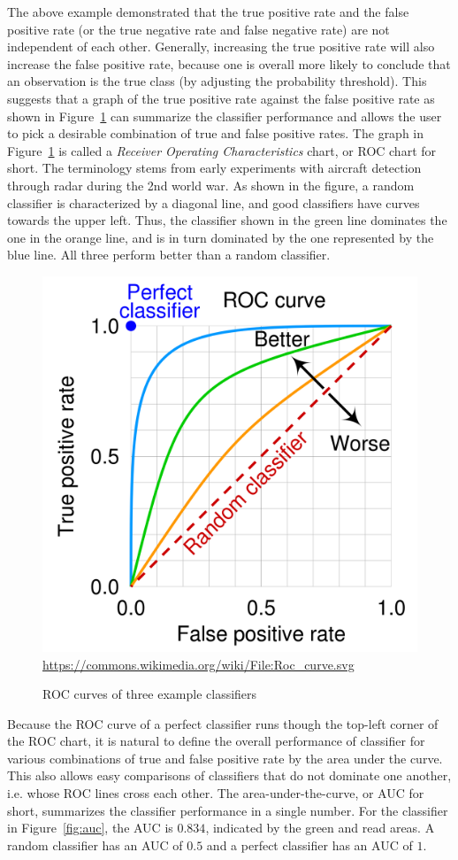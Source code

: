 The above example demonstrated that the true positive rate and the false positive rate (or the true negative rate and false negative rate) are not independent of each other. Generally, increasing the true positive rate will also increase the false positive rate, because one is overall more likely to conclude that an observation is the true class (by adjusting the probability threshold). This suggests that a graph of the true positive rate against the false positive rate as shown in Figure~\ref{fig:roc} can summarize the classifier performance and allows the user to pick a desirable combination of true and false positive rates. The graph in Figure~\ref{fig:roc} is called a \emph{Receiver Operating Characteristics} chart, or ROC chart for short. The terminology stems from early experiments with aircraft detection through radar during the 2nd world war. As shown in the figure, a random classifier is characterized by a diagonal line, and good classifiers have curves towards the upper left. Thus, the classifier shown in the green line dominates the one in the orange line, and is in turn dominated by the one represented by the blue line. All three perform better than a random classifier.

\begin{figure}
\centering
\includegraphics[width=.5\textwidth]{roc.png}
\scriptsize \url{https://commons.wikimedia.org/wiki/File:Roc_curve.svg}
\caption{ROC curves of three example classifiers}
\label{fig:roc}
\end{figure}

Because the ROC curve of a perfect classifier runs though the top-left corner of the ROC chart, it is natural to define the overall performance of classifier for various combinations of true and false positive rate by the area under the curve. This also allows easy comparisons of classifiers that do not dominate one another, i.e. whose ROC lines cross each other. The area-under-the-curve, or AUC for short, summarizes the classifier performance in a single number. For the classifier in Figure~\ref{fig:auc}, the AUC is $0.834$, indicated by the green and read areas. A random classifier has an AUC of $0.5$ and a perfect classifier has an AUC of $1$. 


